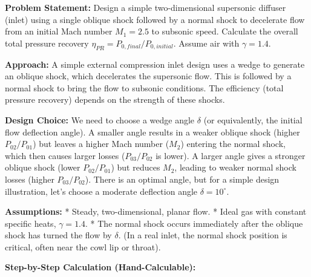 \textbf{Problem Statement:} Design a simple two-dimensional supersonic
diffuser (inlet) using a single oblique shock followed by a normal shock
to decelerate flow from an initial Mach number \(M_1=2.5\) to subsonic
speed. Calculate the overall total pressure recovery
\(\eta_{PR} = P_{0, final}/P_{0, initial}\). Assume air with
\(\gamma = 1.4\).

\textbf{Approach:} A simple external compression inlet design uses a
wedge to generate an oblique shock, which decelerates the supersonic
flow. This is followed by a normal shock to bring the flow to subsonic
conditions. The efficiency (total pressure recovery) depends on the
strength of these shocks.

\textbf{Design Choice:} We need to choose a wedge angle \(\delta\) (or
equivalently, the initial flow deflection angle). A smaller angle
results in a weaker oblique shock (higher \(P_{02}/P_{01}\)) but leaves
a higher Mach number (\(M_2\)) entering the normal shock, which then
causes larger losses (\(P_{03}/P_{02}\) is lower). A larger angle gives
a stronger oblique shock (lower \(P_{02}/P_{01}\)) but reduces \(M_2\),
leading to weaker normal shock losses (higher \(P_{03}/P_{02}\)). There
is an optimal angle, but for a simple design illustration, let's choose
a moderate deflection angle \(\delta = 10^\circ\).

\textbf{Assumptions:} * Steady, two-dimensional, planar flow. * Ideal
gas with constant specific heats, \(\gamma = 1.4\). * The normal shock
occurs immediately after the oblique shock has turned the flow by
\(\delta\). (In a real inlet, the normal shock position is critical,
often near the cowl lip or throat).

\textbf{Step-by-Step Calculation (Hand-Calculable):}

